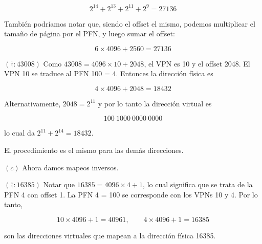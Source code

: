 \documentclass[12pt]{article}
\theoremstyle{definition}
\begin{document}
\begin{equation*}
    2^{14} + 2^{13} + 2^{11} + 2^{9} = 27136
\end{equation*}

También podríamos notar que, siendo el offset el mismo, podemos multiplicar
el tamaño de página por el PFN, y luego sumar el offset:

\begin{equation*}
    6 \times 4096 + 2560 = 27136
\end{equation*}

$(\dagger: 43008)$ Como $43008 = 4096 \times 10 + 2048$, el VPN es 10 y el
offset 2048. El VPN 10 se traduce al PFN 100 = 4. Entonces la dirección física es

\begin{equation*}
    4 \times 4096 + 2048 = 18432
\end{equation*}

Alternativamente, $2048 = 2^{11}$ y por lo tanto la dirección virtual es 

\begin{equation*}
    100 ~ 1000 ~ 0000 ~ 0000
\end{equation*}

lo cual da $2^{11} + 2^{14} = 18432$.

El procedimiento es el mismo para las demás direcciones. 

$(c)$ Ahora damos mapeos inversos. 

$(\dagger : 16385)$ Notar que $16385 = 4096 \times 4 + 1$, lo cual significa que
se trata de la PFN 4 con offset 1. La PFN 4 = 100 se corresponde con los VPNs 10
y 4. Por lo tanto, 

\begin{equation*}
    10 \times 4096 + 1 = 40961, \qquad 4 \times 4096 + 1 = 16385
\end{equation*}

son las direcciones virtuales que mapean a la dirección física 16385.


\pagebreak 
\end{document}
